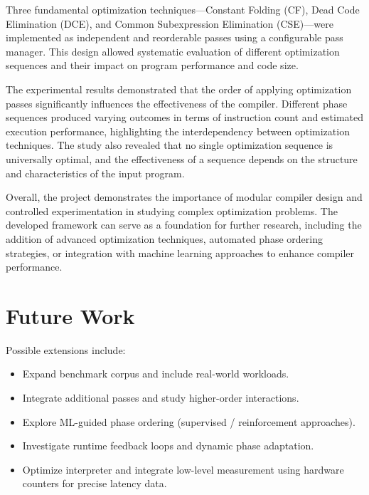 \documentclass[conference]{IEEEtran}
\begin{document}
Three fundamental optimization techniques—Constant Folding (CF), Dead Code Elimination (DCE), and Common Subexpression Elimination (CSE)—were implemented as independent and reorderable passes using a configurable pass manager. This design allowed systematic evaluation of different optimization sequences and their impact on program performance and code size.

The experimental results demonstrated that the order of applying optimization passes significantly influences the effectiveness of the compiler. Different phase sequences produced varying outcomes in terms of instruction count and estimated execution performance, highlighting the interdependency between optimization techniques. The study also revealed that no single optimization sequence is universally optimal, and the effectiveness of a sequence depends on the structure and characteristics of the input program.

Overall, the project demonstrates the importance of modular compiler design and controlled experimentation in studying complex optimization problems. The developed framework can serve as a foundation for further research, including the addition of advanced optimization techniques, automated phase ordering strategies, or integration with machine learning approaches to enhance compiler performance.

\section{Future Work}
Possible extensions include:
\begin{itemize}
    \item Expand benchmark corpus and include real-world workloads.
    \item Integrate additional passes and study higher-order interactions.
    \item Explore ML-guided phase ordering (supervised / reinforcement approaches).
    \item Investigate runtime feedback loops and dynamic phase adaptation.
    \item Optimize interpreter and integrate low-level measurement using hardware counters for precise latency data.
\end{itemize}
\end{document}
